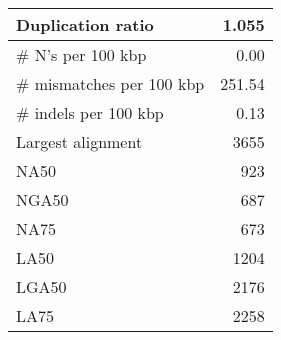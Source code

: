 \documentclass[12pt,a4paper]{article}
\begin{document}
\begin{table}[ht]
\begin{center}
\begin{tabular}{|l*{1}{|r}|}
Duplication ratio & 1.055 \\ \hline
\# N's per 100 kbp & 0.00 \\ \hline
\# mismatches per 100 kbp & 251.54 \\ \hline
\# indels per 100 kbp & 0.13 \\ \hline
Largest alignment & 3655 \\ \hline
NA50 & 923 \\ \hline
NGA50 & 687 \\ \hline
NA75 & 673 \\ \hline
LA50 & 1204 \\ \hline
LGA50 & 2176 \\ \hline
LA75 & 2258 \\ \hline
\end{tabular}
\end{center}
\end{table}
\end{document}
